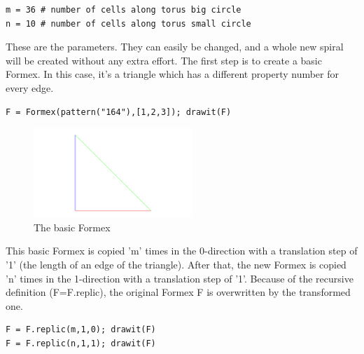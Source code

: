 \begin{verbatim}
m = 36 # number of cells along torus big circle
n = 10 # number of cells along torus small circle
\end{verbatim}
These are the parameters. They can easily be changed, and a whole new spiral will be created without any extra effort.
The first step is to create a basic Formex. In this case, it's a triangle which has a different property number for every edge.
\begin{verbatim}
F = Formex(pattern("164"),[1,2,3]); drawit(F)  
\end{verbatim}
\begin{figure}[ht]
  \centering
  \begin{makeimage}
  \end{makeimage}
  \begin{latexonly}
    \includegraphics[width=6cm]{images/spiral-000}
  \end{latexonly}
  \begin{htmlonly}
  \end{htmlonly}  
  \caption{The basic Formex}
\end{figure}

This basic Formex is copied 'm' times in the 0-direction with a translation 
step of '1' (the length of an edge of the triangle). After that, the new 
Formex is copied 'n' times in the 1-direction with a translation step of '1'. 
Because of the recursive definition (F=F.replic), the original Formex F is 
overwritten by the transformed one.
\begin{verbatim}
F = F.replic(m,1,0); drawit(F)
F = F.replic(n,1,1); drawit(F)
\end{verbatim}


